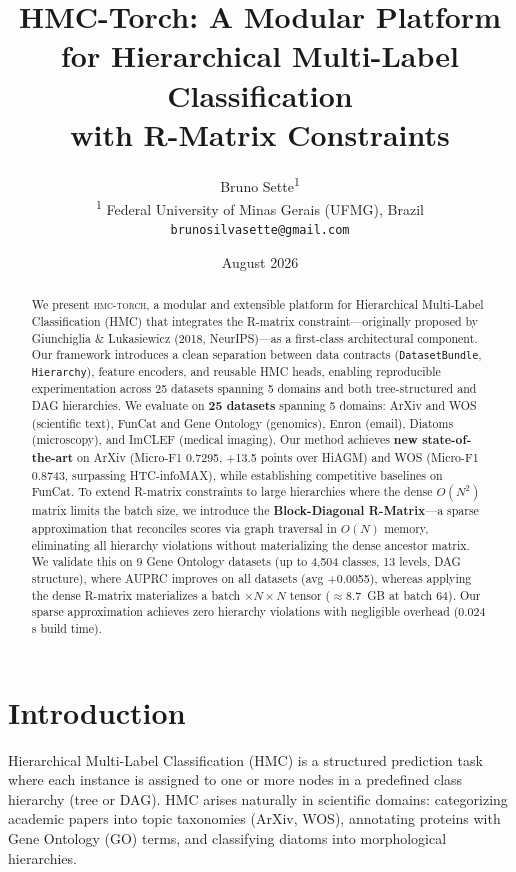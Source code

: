 \documentclass[11pt,a4paper]{article}
\title{\textbf{HMC-Torch: A Modular Platform for Hierarchical Multi-Label
Classification\\ with R-Matrix Constraints}}
\author{
  Bruno Sette\textsuperscript{1} \\
  \textsuperscript{1} Federal University of Minas Gerais (UFMG), Brazil \\
  \texttt{brunosilvasette@gmail.com}
}
\date{August 2026}
\begin{document}
\maketitle

\begin{abstract}
We present \textsc{hmc-torch}, a modular and extensible platform for
Hierarchical Multi-Label Classification (HMC) that integrates the
R-matrix constraint---originally proposed by Giunchiglia \&
Lukasiewicz (2018, NeurIPS)---as a first-class architectural
component. Our framework introduces a clean separation between data
contracts (\texttt{DatasetBundle}, \texttt{Hierarchy}), feature
encoders, and reusable HMC heads, enabling reproducible
experimentation across 25 datasets spanning 5 domains and both
tree-structured and DAG hierarchies. We evaluate on
\textbf{25 datasets} spanning 5 domains: ArXiv and WOS (scientific
text), FunCat and Gene Ontology (genomics), Enron (email), Diatoms
(microscopy), and ImCLEF (medical imaging).
Our method achieves \textbf{new state-of-the-art} on ArXiv (Micro-F1
0.7295, +13.5 points over HiAGM) and WOS (Micro-F1 0.8743,
surpassing HTC-infoMAX), while establishing competitive baselines on
FunCat.  To extend R-matrix constraints to large hierarchies where the
dense $O(N^2)$ matrix limits the batch size, we introduce the
\textbf{Block-Diagonal R-Matrix}---a sparse approximation that
reconciles scores via graph traversal in $O(N)$ memory, eliminating
all hierarchy violations without materializing the dense ancestor
matrix.  We validate this on 9 Gene Ontology datasets (up to 4,504 classes,
13 levels, DAG structure), where AUPRC improves on all datasets
(avg +0.0055), whereas applying the dense R-matrix materializes a
batch $\times N \times N$ tensor ($\approx$8.7~GB at batch 64).  Our sparse approximation achieves zero
hierarchy violations with negligible overhead (0.024\,s build time).
\end{abstract}

\section{Introduction}

Hierarchical Multi-Label Classification (HMC) is a structured
prediction task where each instance is assigned to one or more nodes
in a predefined class hierarchy (tree or DAG). HMC arises naturally in
scientific domains: categorizing academic papers into topic taxonomies
(ArXiv, WOS), annotating proteins with Gene Ontology (GO) terms, and
classifying diatoms into morphological hierarchies.
\end{document}
